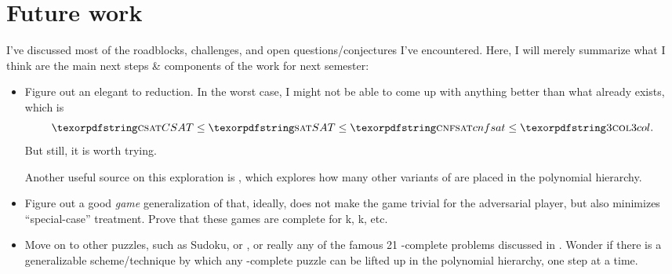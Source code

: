 \chapter{Future work}

\label{ch:future}

I've discussed most of the roadblocks, challenges, and open
questions/conjectures I've encountered.  Here, I will merely summarize what I
think are the main next steps \& components of the work for next semester:

\begin{itemize}

  \item Figure out an elegant \CSAT{} to  reduction.  In the
    worst case, I might not be able to come up with anything better than what
    already exists, which is
    \[
      \CSAT \le \SAT \le \Problem{cnfsat} \le \Problem{3col}.
    \]
    But still, it is worth trying.

    Another useful source on this exploration is
    \textcite{ddls.sat-variants-ph}, which explores how many other variants of
    \SAT{} are placed in the polynomial hierarchy.

  \item Figure out a good \emph{game} generalization of  that,
    ideally, does not make the game trivial for the adversarial player, but
    also minimizes ``special-case'' treatment.  Prove that these games are
    complete for \SigmaP k, \PiP k, etc.

  \item Move on to other puzzles, such as Sudoku, or
    , or really any of the famous 21 \NP-complete
    problems discussed in \textcite{karp.np}.  Wonder if there is a
    generalizable scheme/technique by which any \NP-complete puzzle can be
    lifted up in the polynomial hierarchy, one step at a time.

\end{itemize}

